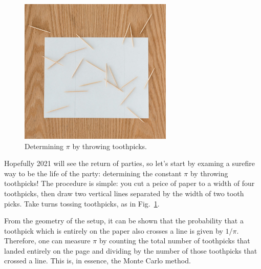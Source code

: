 \begin{figure}[htbp]
\begin{center}
\includegraphics[width=0.65\textwidth]{figs/labs/monte_carlo/pitoss.jpg} 
\caption{Determining $\pi$ by throwing toothpicks.}
\label{fig:pitoss}
\end{center}
\end{figure}

\noindent
Hopefully 2021 will see the return of parties, so let's start by
examing a surefire way to be the life of the party: determining the
constant $\pi$ by throwing toothpicks!  The procedure is simple: you
cut a peice of paper to a width of four toothpicks, then draw two
vertical lines separated by the width of two tooth picks.  Take turns
tossing toothpicks, as in Fig.~\ref{fig:pitoss}.

From the geometry of the setup, it can be shown that the probability
that a toothpick which is entirely on the paper also crosses a line is
given by $1/\pi$.  Therefore, one can measure $\pi$ by counting the
total number of toothpicks that landed entirely on the page and
dividing by the number of those toothpicks that crossed a line.  This
is, in essence, the Monte Carlo method.


